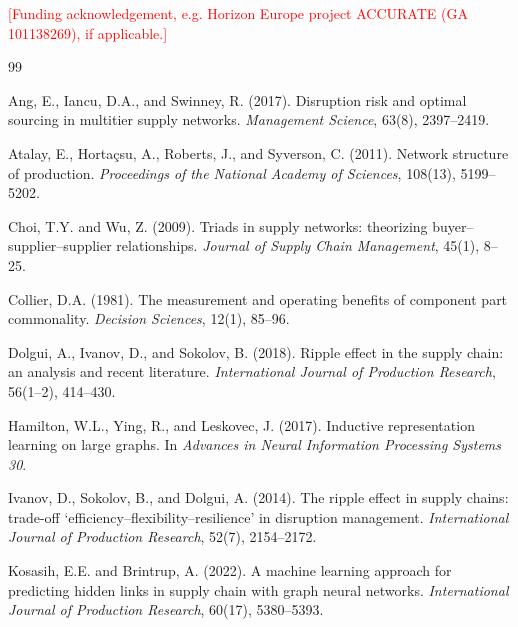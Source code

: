 \documentclass{ifacconf}
\newcommand{\todo}[1]{\textcolor{red}{[#1]}}
\begin{document}
\begin{ack}
\todo{Funding acknowledgement, e.g. Horizon Europe project ACCURATE (GA 101138269), if applicable.}
\end{ack}

\begin{thebibliography}{99}

Ang, E., Iancu, D.A., and Swinney, R. (2017).
\newblock Disruption risk and optimal sourcing in multitier supply networks.
\newblock \emph{Management Science}, 63(8), 2397--2419.

Atalay, E., Horta\c{c}su, A., Roberts, J., and Syverson, C. (2011).
\newblock Network structure of production.
\newblock \emph{Proceedings of the National Academy of Sciences}, 108(13), 5199--5202.

Choi, T.Y. and Wu, Z. (2009).
\newblock Triads in supply networks: theorizing buyer--supplier--supplier relationships.
\newblock \emph{Journal of Supply Chain Management}, 45(1), 8--25.

Collier, D.A. (1981).
\newblock The measurement and operating benefits of component part commonality.
\newblock \emph{Decision Sciences}, 12(1), 85--96.

Dolgui, A., Ivanov, D., and Sokolov, B. (2018).
\newblock Ripple effect in the supply chain: an analysis and recent literature.
\newblock \emph{International Journal of Production Research}, 56(1--2), 414--430.

Hamilton, W.L., Ying, R., and Leskovec, J. (2017).
\newblock Inductive representation learning on large graphs.
\newblock In \emph{Advances in Neural Information Processing Systems 30}.

Ivanov, D., Sokolov, B., and Dolgui, A. (2014).
\newblock The ripple effect in supply chains: trade-off `efficiency--flexibility--resilience' in disruption management.
\newblock \emph{International Journal of Production Research}, 52(7), 2154--2172.

Kosasih, E.E. and Brintrup, A. (2022).
\newblock A machine learning approach for predicting hidden links in supply chain with graph neural networks.
\newblock \emph{International Journal of Production Research}, 60(17), 5380--5393.


\end{thebibliography}
\end{document}
